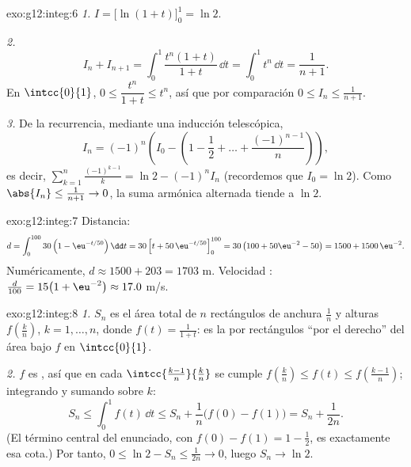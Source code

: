 \begin{solution}{exo:g12:integ:6}
\emph{1.} $I = \bigl[\ln(1+t)\bigr]_0^1 = \ln 2$.

\emph{2.}
\[
I_n + I_{n+1} = \int_0^1 \frac{t^n(1 + t)}{1+t}\,\dd t
= \int_0^1 t^n \,\dd t = \frac{1}{n+1}.
\]
En $\intcc{0}{1}$, $0 \leq \dfrac{t^n}{1+t} \leq t^n$, así que por
comparación $0 \leq I_n \leq \frac{1}{n+1}$.

\emph{3.} De la recurrencia, mediante una inducción telescópica,
\[
I_n = (-1)^n\left(I_0 - \left(1 - \frac12 + \dots + \frac{(-1)^{n-1}}{n}\right)\right),
\]
es decir,
$\displaystyle\sum_{k=1}^{n} \frac{(-1)^{k-1}}{k} = \ln 2 - (-1)^n I_n$
(recordemos que $I_0 = \ln 2$). Como $\abs{I_n} \leq \frac{1}{n+1} \to 0$,
la suma armónica alternada tiende a $\ln 2$.
\end{solution}

\begin{solution}{exo:g12:integ:7}
Distancia:
\[
d = \int_0^{100} 30\left(1 - \eu^{-t/50}\right)\dd t
= 30\left[t + 50\,\eu^{-t/50}\right]_0^{100}
= 30\left(100 + 50\eu^{-2} - 50\right)
= 1500 + 1500\,\eu^{-2}.
\]
Numéricamente, $d \approx 1500 + 203 = 1703$ m. Velocidad :
$\frac{d}{100} = 15\bigl(1 + \eu^{-2}\bigr) \approx 17.0$ m/s.
\end{solution}

\begin{solution}{exo:g12:integ:8}
\emph{1.} $S_n$ es el área total de $n$ rectángulos de anchura $\frac1n$ y
alturas $f\left(\frac kn\right)$, $k = 1, \dots, n$, donde
$f(t) = \frac{1}{1+t}$: es la  por rectángulos ``por el 
derecho'' del área bajo $f$ en $\intcc{0}{1}$.

\emph{2.} $f$ es , así que en cada 
$\intcc{\frac{k-1}{n}}{\frac kn}$ se cumple
$f\left(\frac kn\right) \leq f(t) \leq f\left(\frac{k-1}{n}\right)$;
integrando y sumando sobre $k$:
\[
S_n \leq \int_0^1 f(t)\,\dd t \leq S_n + \frac1n\bigl(f(0) - f(1)\bigr)
= S_n + \frac{1}{2n}.
\]
(El término central del enunciado, con $f(0) - f(1) = 1 - \frac12$, es
exactamente esa cota.) Por tanto,
$0 \leq \ln 2 - S_n \leq \frac{1}{2n} \to 0$, luego $S_n \to \ln 2$.
\end{solution}

